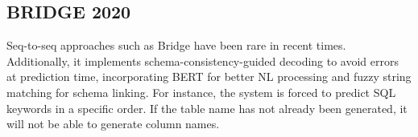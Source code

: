 \subsection{BRIDGE 2020}

Seq-to-seq approaches such as Bridge\cite{lin_bridging_2020} have been rare in recent times.
Additionally, it implements schema-consistency-guided decoding to avoid errors at prediction time, incorporating BERT for better NL processing and fuzzy string matching for schema linking. For instance, the system is forced to predict SQL keywords in a specific order. If the table name has not already been generated, it will not be able to generate column names.
